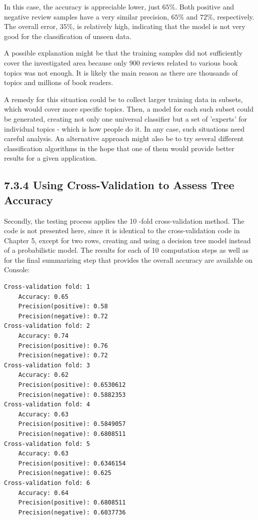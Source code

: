 \documentclass[10pt]{book}
\begin{document}
In this case, the accuracy is appreciable lower, just $65 \%$. Both positive and negative review samples have a very similar precision, $65 \%$ and $72 \%$, respectively. The overall error, $35 \%$, is relatively high, indicating that the model is not very good for the classification of unseen data.

A possible explanation might be that the training samples did not sufficiently cover the investigated area because only 900 reviews related to various book topics was not enough. It is likely the main reason as there are thousands of topics and millions of book readers.

A remedy for this situation could be to collect larger training data in subsets, which would cover more specific topics. Then, a model for each such subset could be generated, creating not only one universal classifier but a set of 'experts' for individual topics - which is how people do it. In any case, such situations need careful analysis. An alternative approach might also be to try several different classification algorithms in the hope that one of them would provide better results for a given application.

\subsection*{7.3.4 Using Cross-Validation to Assess Tree Accuracy}
Secondly, the testing process applies the 10 -fold cross-validation method. The code is not presented here, since it is identical to the cross-validation code in Chapter 5, except for two rows, creating and using a decision tree model instead of a probabilistic model. The results for each of 10 computation steps as well as for the final summarizing step that provides the overall accuracy are available on Console:

\begin{verbatim}
Cross-validation fold: 1
    Accuracy: 0.65
    Precision(positive): 0.58
    Precision(negative): 0.72
Cross-validation fold: 2
    Accuracy: 0.74
    Precision(positive): 0.76
    Precision(negative): 0.72
Cross-validation fold: 3
    Accuracy: 0.62
    Precision(positive): 0.6530612
    Precision(negative): 0.5882353
Cross-validation fold: 4
    Accuracy: 0.63
    Precision(positive): 0.5849057
    Precision(negative): 0.6808511
Cross-validation fold: 5
    Accuracy: 0.63
    Precision(positive): 0.6346154
    Precision(negative): 0.625
Cross-validation fold: 6
    Accuracy: 0.64
    Precision(positive): 0.6808511
    Precision(negative): 0.6037736
\end{verbatim}
\end{document}
